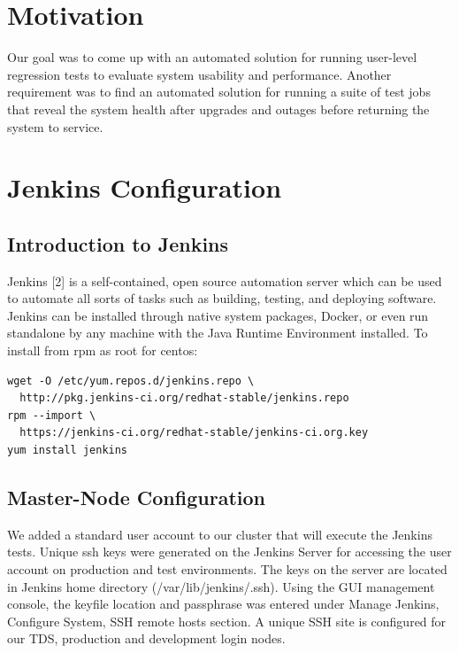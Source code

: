\documentclass[10pt, conference, compsocconf]{IEEEtran}
\begin{document}
%
\IEEEpeerreviewmaketitle

\section{Motivation}
Our goal was to come up with an automated solution for running user-level regression tests to evaluate system usability and performance. Another requirement was to find an automated solution for running a suite of test jobs that reveal the system health after upgrades and outages before returning the system to service.
\section{Jenkins Configuration}
\label{sec:JenkinsConfiguration}

\subsection{Introduction to Jenkins}
Jenkins [2] is a self-contained, open source automation server which can be used to automate all sorts of tasks such as building, testing, and deploying software. Jenkins can be installed through native system packages, Docker, or even run standalone by any machine with the Java Runtime Environment installed. 
To install from rpm as root for centos:
\begin{lstlisting}
wget -O /etc/yum.repos.d/jenkins.repo \
  http://pkg.jenkins-ci.org/redhat-stable/jenkins.repo
rpm --import \
  https://jenkins-ci.org/redhat-stable/jenkins-ci.org.key
yum install jenkins
\end{lstlisting}
\subsection{Master-Node Configuration}
We added a standard user account to our cluster that will execute the Jenkins tests. Unique ssh keys were generated on the Jenkins Server for accessing the user account on production and test environments.  The keys on the server are located in Jenkins home directory (/var/lib/jenkins/.ssh). Using the GUI management console, the keyfile location and passphrase was entered under Manage Jenkins, Configure System, SSH remote hosts section. A unique SSH site is configured for our TDS, production and development login nodes.   
\end{document}
